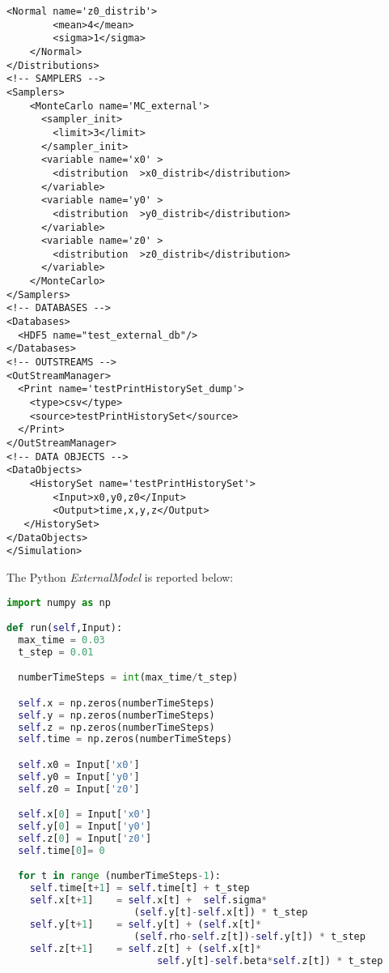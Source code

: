 \begin{lstlisting}[style=XML,morekeywords={debug,re,seeding,class,subType,limit}]
    <Normal name='z0_distrib'>
        <mean>4</mean>
        <sigma>1</sigma>
    </Normal>
</Distributions>
<!-- SAMPLERS -->
<Samplers>
    <MonteCarlo name='MC_external'>
      <sampler_init>
        <limit>3</limit>
      </sampler_init>
      <variable name='x0' >
        <distribution  >x0_distrib</distribution>
      </variable>
      <variable name='y0' >
        <distribution  >y0_distrib</distribution>
      </variable>
      <variable name='z0' >
        <distribution  >z0_distrib</distribution>
      </variable>
    </MonteCarlo>
</Samplers>
<!-- DATABASES -->
<Databases>
  <HDF5 name="test_external_db"/>
</Databases>
<!-- OUTSTREAMS -->
<OutStreamManager>
  <Print name='testPrintHistorySet_dump'>
    <type>csv</type>
    <source>testPrintHistorySet</source>
  </Print>
</OutStreamManager>
<!-- DATA OBJECTS -->
<DataObjects>
    <HistorySet name='testPrintHistorySet'>
        <Input>x0,y0,z0</Input>
        <Output>time,x,y,z</Output>
   </HistorySet>
</DataObjects>
</Simulation>
\end{lstlisting}
The Python \textit{ExternalModel} is reported below:
\begin{lstlisting}[language=python]
import numpy as np

def run(self,Input):
  max_time = 0.03
  t_step = 0.01

  numberTimeSteps = int(max_time/t_step)

  self.x = np.zeros(numberTimeSteps)
  self.y = np.zeros(numberTimeSteps)
  self.z = np.zeros(numberTimeSteps)
  self.time = np.zeros(numberTimeSteps)

  self.x0 = Input['x0']
  self.y0 = Input['y0']
  self.z0 = Input['z0']

  self.x[0] = Input['x0']
  self.y[0] = Input['y0']
  self.z[0] = Input['z0']
  self.time[0]= 0

  for t in range (numberTimeSteps-1):
    self.time[t+1] = self.time[t] + t_step
    self.x[t+1]    = self.x[t] +  self.sigma*
                      (self.y[t]-self.x[t]) * t_step
    self.y[t+1]    = self.y[t] + (self.x[t]*
                      (self.rho-self.z[t])-self.y[t]) * t_step
    self.z[t+1]    = self.z[t] + (self.x[t]*
                          self.y[t]-self.beta*self.z[t]) * t_step
\end{lstlisting}
